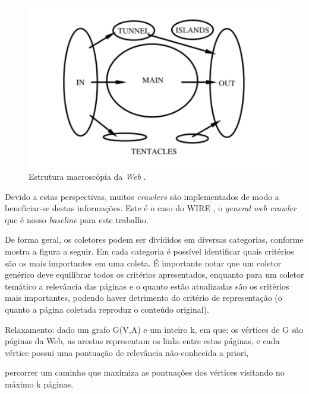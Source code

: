 \documentclass[a4paper,12pt,titlepage]{article}
\begin{document}
\begin{figure}[H]
     \centering
     \includegraphics[scale=0.5]{figures/macroscopic-structure-web.png}
     \caption{Estrutura macroscópia da \textit{Web} \cite{broder}.}
     \label{bsp}
\end{figure}

Devido a estas perspectivas, muitos \textit{crawlers} são implementados de modo a beneficiar-se destas informações. Este é o caso do WIRE \cite{carlos}, o \textit{general web crawler} que é nosso \textit{baseline} para este trabalho. 

De forma geral, os coletores podem ser divididos em diversas categorias, conforme mostra a figura a seguir. Em cada categoria é possível identificar quais critérios são os mais importantes em uma coleta. É importante notar que um coletor genérico deve equilibrar todos os critérios apresentados, enquanto para um coletor temático a relevância das páginas e o quanto estão atualizadas são os critérios mais importantes, podendo haver detrimento do critério de representação (o quanto a página coletada reproduz o conteúdo original). 

Relaxamento: dado um grafo G(V,A) e um inteiro k, em que: 
os vértices de G são páginas da Web, 
as arestas representam os links entre estas páginas, e
cada vértice possui uma pontuação de relevância não-conhecida a priori,

percorrer um caminho que maximiza as pontuações dos vértices visitando no máximo k páginas. \\ 
\end{document}
